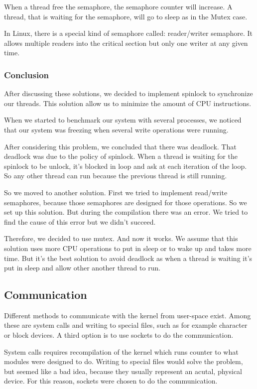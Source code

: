 \documentclass[final,a4paper]{article}
\begin{document}
When a thread free the semaphore, the semaphore counter will increase.
A thread, that is waiting for the semaphore, will go to sleep as in the Mutex
case.

In Linux, there is a special kind of semaphore called: reader/writer semaphore.
It allows multiple readers into the critical section but only one writer at any
given time.

\subsubsection*{Conclusion}
After discussing these solutions, we decided to implement spinlock to
synchronize our threads. This solution allow us to minimize the amount of CPU
instructions.

When we started to benchmark our system with several processes, we noticed that
our system was freezing when several write operations were running.

After considering this problem, we concluded that there was deadlock. That
deadlock was due to the policy of spinlock. When a thread is waiting for the
spinlock to be unlock, it’s blocked in loop and ask at each iteration of the
loop. So any other thread can run because the previous thread is still running.

So we moved to another solution. First we tried to implement read/write
semaphores, because those semaphores are designed for those operations. So we
set up this solution. But during the compilation there was an error. We tried
to find the cause of this error but we didn’t succeed.

Therefore, we decided to use mutex. And now it works. We assume that this
solution uses more CPU operations to put in sleep or to wake up and takes more
time. But it’s the best solution to avoid deadlock as when a thread is waiting
it’s put in sleep and allow other another thread to run.

\subsection*{Communication}
Different methods to communicate with the kernel from user-space exist. Among
these are system calls and writing to special files, such as for example
character or block devices. A third option is to use sockets to do the
communication.

System calls requires recompilation of the kernel which runs counter to what
modules were designed to do. Writing to special files would solve the problem,
but seemed like a bad idea, because they usually represent an acutal, physical
device. For this reason, sockets were chosen to do the communication.
\end{document}
